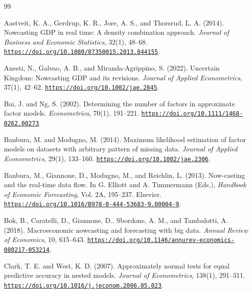 \documentclass[12pt]{article}
\begin{document}
\begin{thebibliography}{99}

Aastveit, K. A., Gerdrup, K. R., Jore, A. S., and Thorsrud, L. A. (2014).
Nowcasting GDP in real time: A density combination approach.
\emph{Journal of Business and Economic Statistics}, 32(1), 48--68. \href{https://doi.org/10.1080/07350015.2013.844155}{\nolinkurl{https://doi.org/10.1080/07350015.2013.844155}}.

Anesti, N., Galvao, A. B., and Miranda-Agrippino, S. (2022).
Uncertain Kingdom: Nowcasting GDP and its revisions.
\emph{Journal of Applied Econometrics}, 37(1), 42--62. \href{https://doi.org/10.1002/jae.2845}{\nolinkurl{https://doi.org/10.1002/jae.2845}}.

Bai, J. and Ng, S. (2002).
Determining the number of factors in approximate factor models.
\emph{Econometrica}, 70(1), 191--221. \href{https://doi.org/10.1111/1468-0262.00273}{\nolinkurl{https://doi.org/10.1111/1468-0262.00273}}.

Banbura, M. and Modugno, M. (2014).
Maximum likelihood estimation of factor models on datasets with arbitrary pattern of missing data.
\emph{Journal of Applied Econometrics}, 29(1), 133--160. \href{https://doi.org/10.1002/jae.2306}{\nolinkurl{https://doi.org/10.1002/jae.2306}}.

Banbura, M., Giannone, D., Modugno, M., and Reichlin, L. (2013).
Now-casting and the real-time data flow.
In G. Elliott and A. Timmermann (Eds.), \emph{Handbook of Economic Forecasting}, Vol. 2A, 195--237. Elsevier. \href{https://doi.org/10.1016/B978-0-444-53683-9.00004-9}{\nolinkurl{https://doi.org/10.1016/B978-0-444-53683-9.00004-9}}.

Bok, B., Caratelli, D., Giannone, D., Sbordone, A. M., and Tambalotti, A. (2018).
Macroeconomic nowcasting and forecasting with big data.
\emph{Annual Review of Economics}, 10, 615--643. \href{https://doi.org/10.1146/annurev-economics-080217-053214}{\nolinkurl{https://doi.org/10.1146/annurev-economics-080217-053214}}.

Clark, T. E. and West, K. D. (2007).
Approximately normal tests for equal predictive accuracy in nested models.
\emph{Journal of Econometrics}, 138(1), 291--311. \href{https://doi.org/10.1016/j.jeconom.2006.05.023}{\nolinkurl{https://doi.org/10.1016/j.jeconom.2006.05.023}}.


\end{thebibliography}
\end{document}
